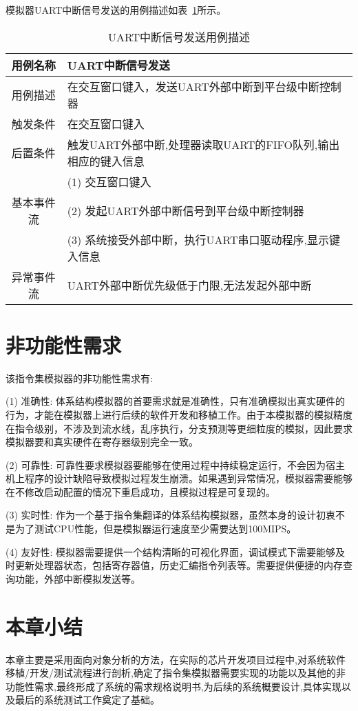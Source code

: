 模拟器UART中断信号发送的用例描述如表~\ref{tab:yongli5}所示。
\begin{table}[H]
  \centering
  \caption{UART中断信号发送用例描述}
  \label{tab:yongli5}
  \renewcommand\arraystretch{1.1}
  \begin{tabular}{cl}
    \toprule
用例名称 & UART中断信号发送\\
    \midrule
用例描述	& \multicolumn{1}{p{9cm}}{在交互窗口键入，发送UART外部中断到平台级中断控制器}\\ \hline
触发条件	& \multicolumn{1}{p{9cm}}{在交互窗口键入}\\ \hline
后置条件	& \multicolumn{1}{p{9cm}}{触发UART外部中断,处理器读取UART的FIFO队列,输出相应的键入信息}\\ \hline
 &	\multicolumn{1}{p{9cm}}{(1)	交互窗口键入}\\
 基本事件流 & \multicolumn{1}{p{9cm}}{(2)	发起UART外部中断信号到平台级中断控制器}\\
 & \multicolumn{1}{p{9cm}}{(3)	系统接受外部中断，执行UART串口驱动程序,显示键入信息}\\ \hline
异常事件流 &	\multicolumn{1}{p{9cm}}{UART外部中断优先级低于门限,无法发起外部中断}\\
    \bottomrule
  \end{tabular}
\end{table}


\section{非功能性需求}

该指令集模拟器的非功能性需求有:


(1) 准确性: 体系结构模拟器的首要需求就是准确性，只有准确模拟出真实硬件的行为，才能在模拟器上进行后续的软件开发和移植工作。由于本模拟器的模拟精度在指令级别，不涉及到流水线，乱序执行，分支预测等更细粒度的模拟，因此要求模拟器要和真实硬件在寄存器级别完全一致。


(2) 可靠性: 可靠性要求模拟器要能够在使用过程中持续稳定运行，不会因为宿主机上程序的设计缺陷导致模拟过程发生崩溃。如果遇到异常情况，模拟器需要能够在不修改启动配置的情况下重启成功，且模拟过程是可复现的。


(3) 实时性: 作为一个基于指令集翻译的体系结构模拟器，虽然本身的设计初衷不是为了测试CPU性能，但是模拟器运行速度至少需要达到100MIPS。


(4) 友好性: 模拟器需要提供一个结构清晰的可视化界面，调试模式下需要能够及时更新处理器状态，包括寄存器值，历史汇编指令列表等。需要提供便捷的内存查询功能，外部中断模拟发送等。




\section{本章小结}

本章主要是采用面向对象分析的方法，在实际的芯片开发项目过程中,对系统软件移植/开发/测试流程进行剖析,确定了指令集模拟器需要实现的功能以及其他的非功能性需求,最终形成了系统的需求规格说明书,为后续的系统概要设计,具体实现以及最后的系统测试工作奠定了基础。


